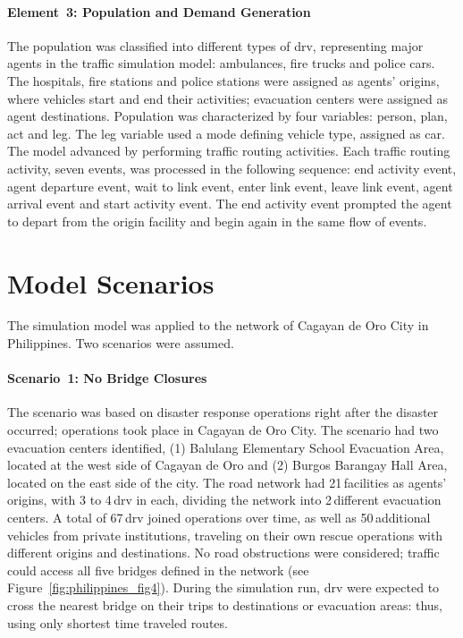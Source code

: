 \paragraph{Element~3: Population and Demand Generation}
The population was classified into different types of \gls{drv}, representing major agents in the traffic simulation model: ambulances, fire trucks and police cars.  The hospitals, fire stations and police stations were assigned as agents' origins, where vehicles start and end their activities; evacuation centers were assigned as agent destinations. Population was characterized by four variables: person, plan, act and leg. The leg variable used a mode defining vehicle type, assigned as car. The model advanced by performing traffic routing activities. Each traffic routing activity, seven events, was processed in the following sequence: end activity event, agent departure event, wait to link event, enter link event, leave link event, agent arrival event and start activity event. The end activity event prompted the agent to depart from the origin facility and begin again in the same flow of events. 

\section{Model Scenarios} 
The simulation model was applied to the network of Cagayan de Oro City in Philippines. Two scenarios were assumed.

\paragraph{Scenario~1: No Bridge Closures}
The scenario was based on disaster response operations right after the disaster occurred; operations took place in Cagayan de Oro City. The scenario had two evacuation centers identified, (1) Balulang Elementary School Evacuation Area, located at the west side of Cagayan de Oro and (2) Burgos Barangay Hall Area, located on the east side of the city. The road network had 21\,facilities as agents' origins, with 3 to 4\,\gls{drv} in each, dividing the network into 2\,different evacuation centers. A total of 67\,\gls{drv} joined operations over time, as well as 50\,additional vehicles from private institutions, traveling on their own rescue operations with different origins and destinations. No road obstructions were considered; traffic could access all five bridges defined in the network (see Figure~\ref{fig:philippines_fig4}). During the simulation run, \gls{drv} were expected to cross the nearest bridge on their trips to destinations or evacuation areas: thus, using only shortest time traveled routes.


